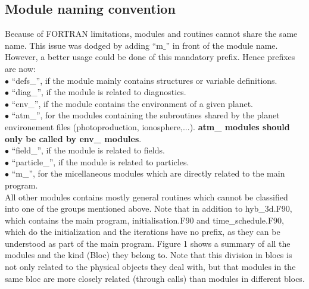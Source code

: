 \documentclass{article}
\begin{document}
\subsection{Module naming convention}
Because of FORTRAN limitations, modules and routines cannot share the same name. This issue was dodged by adding ``m$\_$'' in front of the module name. However, a better usage could be done of this mandatory prefix. Hence prefixes are now: \\
$\bullet$ ``defs\_'', if the module mainly contains structures or variable definitions.\\
$\bullet$ ``diag\_'', if the module is related to diagnostics.\\
$\bullet$ ``env\_'', if the module contains the environment of a given planet.\\
$\bullet$ ``atm\_'', for the modules containing the subroutines shared by the planet environement files (photoproduction, ionosphere,...). {\bf atm\_ modules should only be called by env\_ modules}.\\
$\bullet$ ``field\_'', if the module is related to fields.\\
$\bullet$ ``particle\_'', if the module is related to particles.\\
$\bullet$ ``m\_'', for the micellaneous modules which are directly related to the main program.\\
All other modules contains mostly general routines which cannot be classified into one of the groups mentioned above.
Note that in addition to hyb\_3d.F90, which contains the main program, initialisation.F90 and time\_schedule.F90, which do the initialization and the iterations have no prefix, as they can be understood as part of the main program. Figure 1 shows a summary of all the modules and the kind (Bloc) they belong to. Note that this division in blocs is not only related to the physical objects they deal with, but that modules in the same bloc are more closely related (through calls) than modules in different blocs.
\end{document}
